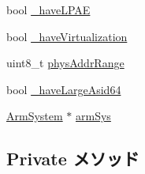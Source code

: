 \begin{DoxyCompactItemize}
\item 
bool \hyperlink{classArmISA_1_1TableWalker_a74ac6c840c516a9b8a6eb63ed9ef1185}{\_\-haveLPAE}
\item 
bool \hyperlink{classArmISA_1_1TableWalker_a8327a5b4e38733a0d77ae856ba67725f}{\_\-haveVirtualization}
\item 
uint8\_\-t \hyperlink{classArmISA_1_1TableWalker_af85538fbb375410b2750035ab34dc88a}{physAddrRange}
\item 
bool \hyperlink{classArmISA_1_1TableWalker_af7d46e1faf4b0edb95f404a28e31902d}{\_\-haveLargeAsid64}
\item 
\hyperlink{classArmSystem}{ArmSystem} $\ast$ \hyperlink{classArmISA_1_1TableWalker_a937afcdcc940e8070627553eaebfa58a}{armSys}
\end{DoxyCompactItemize}
\subsection*{Private メソッド}
